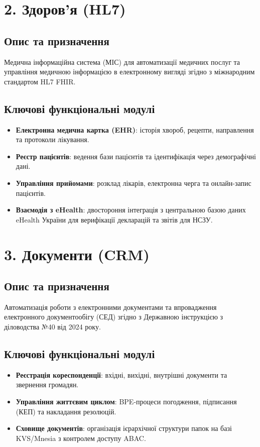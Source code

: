 \section{2. Здоров'я (HL7)}
\subsection{Опис та призначення}
Медична інформаційна система (МІС) для автоматизації медичних послуг та управління медичною інформацією в електронному вигляді згідно з міжнародним стандартом HL7 FHIR.
\subsection{Ключові функціональні модулі}
\begin{itemize}
    \item \textbf{Електронна медична картка (EHR)}: історія хвороб, рецепти, направлення та протоколи лікування.
    \item \textbf{Реєстр пацієнтів}: ведення бази пацієнтів та ідентифікація через демографічні дані.
    \item \textbf{Управління прийомами}: розклад лікарів, електронна черга та онлайн-запис пацієнтів.
    \item \textbf{Взаємодія з eHealth}: двостороння інтеграція з центральною базою даних eHealth України для верифікації декларацій та звітів для НСЗУ.
\end{itemize}

\section{3. Документи (CRM)}
\subsection{Опис та призначення}
Автоматизація роботи з електронними документами та впровадження електронного документообігу (СЕД) згідно з Державною інструкцією з діловодства №40 від 2024 року.
\subsection{Ключові функціональні модулі}
\begin{itemize}
    \item \textbf{Реєстрація кореспонденції}: вхідні, вихідні, внутрішні документи та звернення громадян.
    \item \textbf{Управління життєвим циклом}: BPE-процеси погодження, підписання (КЕП) та накладання резолюцій.
    \item \textbf{Сховище документів}: організація ієрархічної структури папок на базі KVS/Mnesia з контролем доступу ABAC.
\end{itemize}

